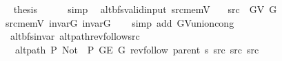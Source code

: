 \begin{isabellebody}
\ \isamarkupfalse%
\ {\isacharquery}{\kern0pt}thesis\isanewline
\ \ \ \ \isamarkupfalse%
\ simp\isanewline
{}\isamarkupfalse%
%
\endisatagproof
{\isafoldproof}%
%
\isadelimproof
\isanewline
%
\endisadelimproof
%
\isadeliminvisible
\isanewline
%
\endisadeliminvisible
%
\isataginvisible
{}\isamarkupfalse%
\ {\isacharparenleft}{\kern0pt}\ alt{\isacharunderscore}{\kern0pt}bfs{\isacharunderscore}{\kern0pt}valid{\isacharunderscore}{\kern0pt}input{\isacharparenright}{\kern0pt}\ src{\isacharunderscore}{\kern0pt}mem{\isacharunderscore}{\kern0pt}V{\isacharcolon}{\kern0pt}\isanewline
\ \ \ {\isachardoublequoteopen}src\ {\isasymin}\ G{\isachardot}{\kern0pt}V\ G{\isachardoublequoteclose}%
\endisataginvisible
{\isafoldinvisible}%
%
\isadeliminvisible
\isanewline
%
\endisadeliminvisible
%
\isadelimproof
\ \ %
\endisadelimproof
%
\isatagproof
{}\isamarkupfalse%
\ src{\isacharunderscore}{\kern0pt}mem{\isacharunderscore}{\kern0pt}V{}\ invar{\isacharunderscore}{\kern0pt}G{}\ invar{\isacharunderscore}{\kern0pt}G{}\isanewline
\ \ \isamarkupfalse%
\ {\isacharparenleft}{\kern0pt}simp\ add{\isacharcolon}{\kern0pt}\ G{\isachardot}{\kern0pt}V{\isacharunderscore}{\kern0pt}union{\isacharunderscore}{\kern0pt}cong{\isacharparenright}{\kern0pt}%
\endisatagproof
{\isafoldproof}%
%
\isadelimproof
\isanewline
%
\endisadelimproof
%
\isadeliminvisible
\isanewline
%
\endisadeliminvisible
%
\isataginvisible
{}\isamarkupfalse%
\ {\isacharparenleft}{\kern0pt}\ alt{\isacharunderscore}{\kern0pt}bfs{\isacharunderscore}{\kern0pt}invar{\isacharparenright}{\kern0pt}\ alt{\isacharunderscore}{\kern0pt}path{\isacharunderscore}{\kern0pt}rev{\isacharunderscore}{\kern0pt}follow{\isacharunderscore}{\kern0pt}src{\isacharcolon}{\kern0pt}\isanewline
\ \ \ {\isachardoublequoteopen}alt{\isacharunderscore}{\kern0pt}path\ P{\isacharprime}{\kern0pt}{\isacharprime}{\kern0pt}\ {\isacharparenleft}{\kern0pt}Not\ {\isasymcirc}\ P{\isacharprime}{\kern0pt}{\isacharprime}{\kern0pt}{\isacharparenright}{\kern0pt}\ {\isacharparenleft}{\kern0pt}G{\isachardot}{\kern0pt}E\ G{\isacharparenright}{\kern0pt}\ {\isacharparenleft}{\kern0pt}rev{\isacharunderscore}{\kern0pt}follow\ {\isacharparenleft}{\kern0pt}parent\ s{\isacharparenright}{\kern0pt}\ src{\isacharparenright}{\kern0pt}\ src\ src{\isachardoublequoteclose}%
\endisataginvisible
{\isafoldinvisible}%
%
\isadeliminvisible
\isanewline
%
\endisadeliminvisible
%
\isadelimproof

\end{isabellebody}
